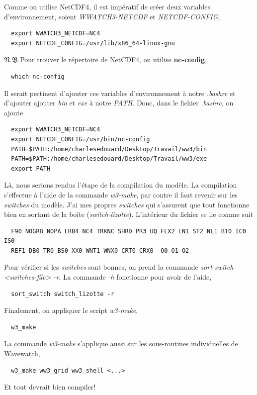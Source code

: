 \documentclass[10pt]{article}
\numberwithin{equation}{section}
\newcommand{\pt}{\hspace{1pt}} %
\newcommand{\nb}{\underline{{\footnotesize\EightStarConvex}\pt $\mathfrak{N.B.}$\vphantom{p}}\hspace{3pt}}
\begin{document}
Comme on utilise NetCDF4, il est impératif de créer deux variables d'environnement, soient \emph{WWATCH3-NETCDF} et \emph{NETCDF-CONFIG}, 
\begin{verbatim}
  export WWATCH3_NETCDF=NC4
  export NETCDF_CONFIG=/usr/lib/x86_64-linux-gnu
\end{verbatim}

\nb Pour trouver le répertoire de NetCDF4, on utilise \textbf{nc-config}, 
\begin{verbatim}
  which nc-config
\end{verbatim}

Il serait pertinent d'ajouter ces variables d'environnement à notre \emph{.bashrc} et d'ajouter ajouter \emph{bin} et \emph{exe} à notre \emph{PATH}.
Donc, dans le fichier \emph{.bashrc}, on ajoute
\begin{verbatim}
  export WWATCH3_NETCDF=NC4
  export NETCDF_CONFIG=/usr/bin/nc-config
  PATH=$PATH:/home/charlesedouard/Desktop/Travail/ww3/bin
  PATH=$PATH:/home/charlesedouard/Desktop/Travail/ww3/exe
  export PATH
\end{verbatim}
Là, nous serions rendus l'étape de la compilation du modèle.
La compilation s'effectue à l'aide de la commande \emph{w3-make}, par contre il faut revenir sur les \emph{switches} du modèle.
J'ai mes propres \emph{switches} qui s'assurent que tout fonctionne bien en sortant de la boîte (\emph{switch-lizotte}).
L'intérieur du fichier se lie comme suit
\begin{verbatim}
  F90 NOGRB NOPA LRB4 NC4 TRKNC SHRD PR3 UQ FLX2 LN1 ST2 NL1 BT0 IC0 IS0
  REF1 DB0 TR0 BS0 XX0 WNT1 WNX0 CRT0 CRX0  O0 O1 O2
\end{verbatim}
Pour vérifier si les \emph{switches} sont bonnes, on prend la commande \emph{sort-switch <switches-file> -r}.
La commande \emph{-h} fonctionne pour avoir de l'aide,
\begin{verbatim}
  sort_switch switch_lizotte -r
\end{verbatim}
Finalement, on appliquer le script \emph{w3-make},
\begin{verbatim}
  w3_make
\end{verbatim}
La commande \emph{w3-make} s'applique aussi sur les sous-routines individuelles de Wavewatch,
\begin{verbatim}
  w3_make ww3_grid ww3_shell <...>
\end{verbatim}
Et tout devrait bien compiler!
\end{document}
